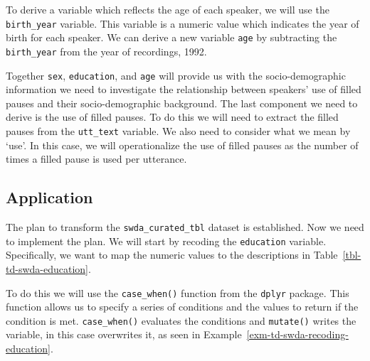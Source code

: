\documentclass[
  letterpaper,
  DIV=11,
  numbers=noendperiod]{scrreport}
\theoremstyle{definition}
\theoremstyle{remark}
\begin{document}
To derive a variable which reflects the age of each speaker, we will use
the \texttt{birth\_year} variable. This variable is a numeric value
which indicates the year of birth for each speaker. We can derive a new
variable \texttt{age} by subtracting the \texttt{birth\_year} from the
year of recordings, 1992.

Together \texttt{sex}, \texttt{education}, and \texttt{age} will provide
us with the socio-demographic information we need to investigate the
relationship between speakers' use of filled pauses and their
socio-demographic background. The last component we need to derive is
the use of filled pauses. To do this we will need to extract the filled
pauses from the \texttt{utt\_text} variable. We also need to consider
what we mean by `use'. In this case, we will operationalize the use of
filled pauses as the number of times a filled pause is used per
utterance.

\hypertarget{sec-td-recoding-application}{%
\subsection{Application}\label{sec-td-recoding-application}}

The plan to transform the \texttt{swda\_curated\_tbl} dataset is
established. Now we need to implement the plan. We will start by
recoding the \texttt{education} variable. Specifically, we want to map
the numeric values to the descriptions in
Table~\ref{tbl-td-swda-education}.

To do this we will use the \texttt{case\_when()} function from the
\texttt{dplyr} package. This function allows us to specify a series of
conditions and the values to return if the condition is met.
\texttt{case\_when()} evaluates the conditions and \texttt{mutate()}
writes the variable, in this case overwrites it, as seen in
Example~\ref{exm-td-swda-recoding-education}.
\end{document}
